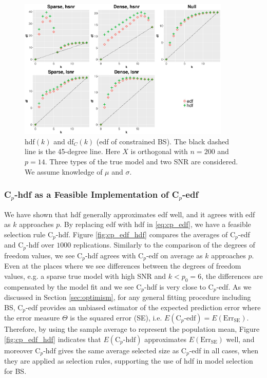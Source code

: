 \begin{figure}[!ht]
	\centering
	\includegraphics[width=0.9\textwidth]{figures/hdf_edf_bs.eps}
	\caption{hdf$(k)$ and df$_C(k)$ (edf of constrained BS). The black dashed line is the 45-degree line. Here $X$ is orthogonal with $n=200$ and $p=14$. Three types of the true model and two SNR are considered. We assume knowledge of $\mu$ and $\sigma$.}
	\label{fig:dfc_dflambda}
\end{figure}



\subsubsection{\texorpdfstring{C$_p$}{Lg}-hdf as a Feasible Implementation of \texorpdfstring{C$_p$}{Lg}-edf }
\label{sec:cp_edf_hdf}
We have shown that hdf generally approximates edf well, and it agrees with edf as $k$ approaches $p$. By replacing edf with hdf in \eqref{eq:cp_edf}, we have a feasible selection rule C$_p$-hdf. Figure \ref{fig:cp_edf_hdf} compares the averages of C$_p$-edf and C$_p$-hdf over $1000$ replications. Similarly to the comparison of the degrees of freedom values, we see C$_p$-hdf agrees with C$_p$-edf on average as $k$ approaches $p$. Even at the places where we see differences between the degrees of freedom values, e.g. a sparse true model with high SNR and $k<p_0=6$, the differences are compensated by the model fit and we see C$_p$-hdf is very close to C$_p$-edf. As we discussed in Section \ref{sec:optimism}, for any general fitting procedure including BS, C$_p$-edf provides an unbiased estimator of the expected prediction error where the error measure $\Theta$ is the squared error (SE), i.e. $E(\text{C}_p\text{-edf}) = E(\text{Err}_{\text{SE}})$. Therefore, by using the sample average to represent the population mean, Figure \ref{fig:cp_edf_hdf} indicates that $E(\text{C}_p\text{-hdf})$ approximates $E(\text{Err}_{\text{SE}})$ well, and moreover C$_p$-hdf gives the same average selected size as C$_p$-edf in all cases, when they are applied as selection rules, supporting the use of hdf in model selection for BS.

